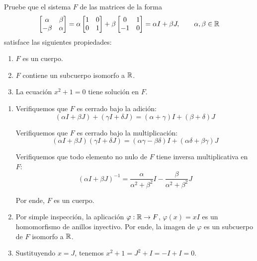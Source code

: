 \begin{exercise}
Pruebe que el sistema $F$ de las matrices de la forma
$$
\begin{bmatrix} \alpha & \beta \\ {-\beta} & \alpha \end{bmatrix}
    = \alpha \begin{bmatrix} 1 & 0 \\ 0 & 1 \end{bmatrix} + \beta \begin{bmatrix} 0 & 1 \\ {-1} & 0 \end{bmatrix}
    = \alpha I + \beta J, \qquad \alpha, \beta \in \mathbb R
$$
satisface las siguientes propiedades:
\begin{enumerate}
    \item $F$ es un cuerpo.
    \item $F$ contiene un subcuerpo isomorfo a $\mathbb R$.
    \item La ecuación $x^2 + 1 = 0$ tiene solución en $F$.
\end{enumerate}
\end{exercise}

\begin{solution}
\leavevmode
\begin{enumerate}[label=(\alph*)]
    \item Verifiquemos que $F$ es cerrado bajo la adición:
    $$(\alpha I + \beta J) + (\gamma I + \delta J) = (\alpha + \gamma) I + (\beta + \delta) J$$
    
    Verifiquemos que $F$ es cerrado bajo la multiplicación:
    $$(\alpha I + \beta J) (\gamma I + \delta J) = (\alpha \gamma - \beta \delta) I + (\alpha \delta + \beta \gamma) J$$
    
    Verifiquemos que todo elemento no nulo de $F$ tiene inversa multiplicativa en $F$:
    $$(\alpha I + \beta J)^{-1} = \frac \alpha {\alpha^2 + \beta^2} I - \frac \beta {\alpha^2 + \beta^2} J$$
    
    Por ende, $F$ es un cuerpo.
    
    \item Por simple inspección, la aplicación $\varphi : \mathbb R \to F$, $\varphi(x) = xI$ es un homomorfismo de anillos inyectivo. Por ende, la imagen de $\varphi$ es un subcuerpo de $F$ isomorfo a $\mathbb R$.
    
    \item Sustituyendo $x = J$, tenemos $x^2 + 1 = J^2 + I = -I + I = 0$.
\end{enumerate}
\end{solution}
